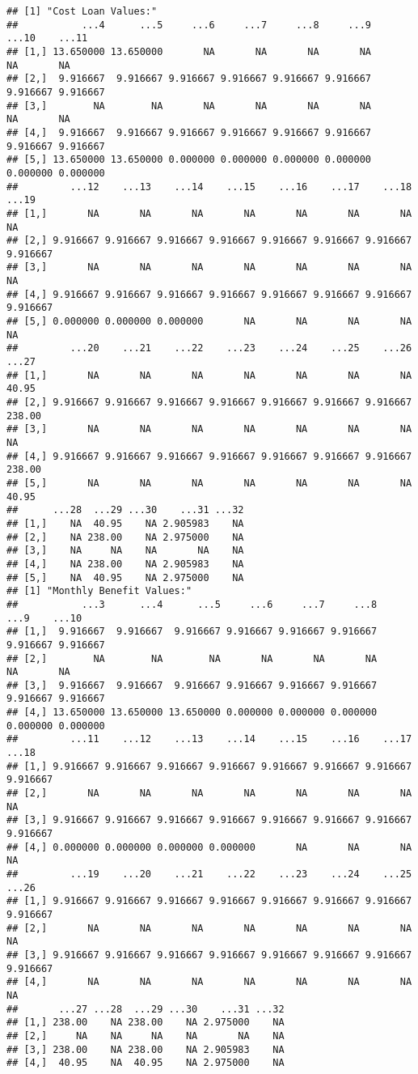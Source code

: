\documentclass[
]{article}
\begin{document}
\begin{verbatim}
## [1] "Cost Loan Values:"
##           ...4      ...5     ...6     ...7     ...8     ...9    ...10    ...11
## [1,] 13.650000 13.650000       NA       NA       NA       NA       NA       NA
## [2,]  9.916667  9.916667 9.916667 9.916667 9.916667 9.916667 9.916667 9.916667
## [3,]        NA        NA       NA       NA       NA       NA       NA       NA
## [4,]  9.916667  9.916667 9.916667 9.916667 9.916667 9.916667 9.916667 9.916667
## [5,] 13.650000 13.650000 0.000000 0.000000 0.000000 0.000000 0.000000 0.000000
##         ...12    ...13    ...14    ...15    ...16    ...17    ...18    ...19
## [1,]       NA       NA       NA       NA       NA       NA       NA       NA
## [2,] 9.916667 9.916667 9.916667 9.916667 9.916667 9.916667 9.916667 9.916667
## [3,]       NA       NA       NA       NA       NA       NA       NA       NA
## [4,] 9.916667 9.916667 9.916667 9.916667 9.916667 9.916667 9.916667 9.916667
## [5,] 0.000000 0.000000 0.000000       NA       NA       NA       NA       NA
##         ...20    ...21    ...22    ...23    ...24    ...25    ...26  ...27
## [1,]       NA       NA       NA       NA       NA       NA       NA  40.95
## [2,] 9.916667 9.916667 9.916667 9.916667 9.916667 9.916667 9.916667 238.00
## [3,]       NA       NA       NA       NA       NA       NA       NA     NA
## [4,] 9.916667 9.916667 9.916667 9.916667 9.916667 9.916667 9.916667 238.00
## [5,]       NA       NA       NA       NA       NA       NA       NA  40.95
##      ...28  ...29 ...30    ...31 ...32
## [1,]    NA  40.95    NA 2.905983    NA
## [2,]    NA 238.00    NA 2.975000    NA
## [3,]    NA     NA    NA       NA    NA
## [4,]    NA 238.00    NA 2.905983    NA
## [5,]    NA  40.95    NA 2.975000    NA
## [1] "Monthly Benefit Values:"
##           ...3      ...4      ...5     ...6     ...7     ...8     ...9    ...10
## [1,]  9.916667  9.916667  9.916667 9.916667 9.916667 9.916667 9.916667 9.916667
## [2,]        NA        NA        NA       NA       NA       NA       NA       NA
## [3,]  9.916667  9.916667  9.916667 9.916667 9.916667 9.916667 9.916667 9.916667
## [4,] 13.650000 13.650000 13.650000 0.000000 0.000000 0.000000 0.000000 0.000000
##         ...11    ...12    ...13    ...14    ...15    ...16    ...17    ...18
## [1,] 9.916667 9.916667 9.916667 9.916667 9.916667 9.916667 9.916667 9.916667
## [2,]       NA       NA       NA       NA       NA       NA       NA       NA
## [3,] 9.916667 9.916667 9.916667 9.916667 9.916667 9.916667 9.916667 9.916667
## [4,] 0.000000 0.000000 0.000000 0.000000       NA       NA       NA       NA
##         ...19    ...20    ...21    ...22    ...23    ...24    ...25    ...26
## [1,] 9.916667 9.916667 9.916667 9.916667 9.916667 9.916667 9.916667 9.916667
## [2,]       NA       NA       NA       NA       NA       NA       NA       NA
## [3,] 9.916667 9.916667 9.916667 9.916667 9.916667 9.916667 9.916667 9.916667
## [4,]       NA       NA       NA       NA       NA       NA       NA       NA
##       ...27 ...28  ...29 ...30    ...31 ...32
## [1,] 238.00    NA 238.00    NA 2.975000    NA
## [2,]     NA    NA     NA    NA       NA    NA
## [3,] 238.00    NA 238.00    NA 2.905983    NA
## [4,]  40.95    NA  40.95    NA 2.975000    NA
\end{verbatim}
\end{document}
